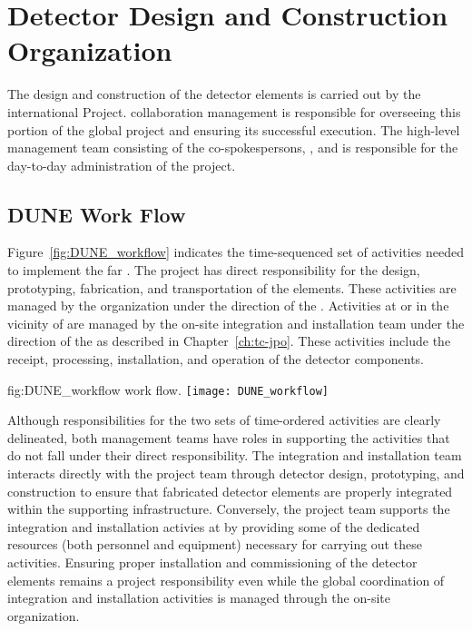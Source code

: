 ﻿\chapter{Detector Design and Construction Organization}
\label{vl:tc-overview}

The design and construction of the  detector elements is 
carried out by the international  Project.  
collaboration management is responsible for overseeing this portion 
of the global project and ensuring its successful execution.  
The high-level  management team consisting of the 
co-spokespersons, , and  is responsible 
for the day-to-day administration of the project.  

\section{DUNE Work Flow}
\label{sec:workflow}

Figure~\ref{fig:DUNE_workflow} indicates the time-sequenced set of 
activities needed to implement the  far .
The  project has direct responsibility for the design, 
prototyping, fabrication, and transportation of the  
elements.  These activities are managed by the   
organization under the direction of the .  Activities at 
or in the vicinity of  are managed by the on-site integration and
installation team under the direction of the  as described 
in Chapter~\ref{ch:tc-jpo}.  These activities include the receipt,
processing, installation, and operation of the detector components.            
\begin{dunefigure}{fig:DUNE_workflow}
  { work flow.}
  \texttt{[image: DUNE\_workflow]}
\end{dunefigure}

Although responsibilities for the two sets of time-ordered activities 
are clearly delineated, both management teams have roles in supporting
the activities that do not fall under their direct responsibility.  The 
integration and installation team interacts directly with the  
project team through detector design, prototyping, and construction to 
ensure that fabricated detector elements are properly integrated within 
the supporting infrastructure.  Conversely, the  project team %
supports the integration and installation activies at  by providing 
some of the dedicated resources (both personnel and equipment) necessary 
for carrying out these activities.  Ensuring proper installation and 
commissioning of the detector elements remains a  project
responsibility even while the global coordination of integration and 
installation activities is managed through the on-site organization.  

